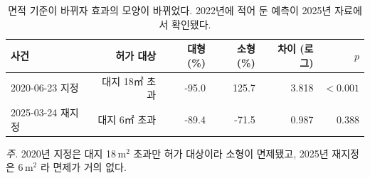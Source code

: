 \begin{table}[htbp]
  \centering
  \caption{면적 기준이 바뀌자 효과의 모양이 바뀌었다. 2022년에 적어 둔 예측이 2025년 자료에서 확인됐다.}
  \label{tab:size-ddd}
  \begin{tabular}{lrrrrr}
    \toprule
    \textbf{사건} & \textbf{허가 대상} & \textbf{대형 (\%)} & \textbf{소형 (\%)} & \textbf{차이 (로그)} & \textbf{$p$} \\
    \midrule
    2020-06-23 지정 & 대지 18㎡ 초과 & -95.0 & 125.7 & 3.818 & $<0.001$ \\
    2025-03-24 재지정 & 대지 6㎡ 초과 & -89.4 & -71.5 & 0.987 & 0.388 \\
    \bottomrule
  \end{tabular}

  \begin{minipage}{\linewidth}\footnotesize
  \textit{주.} 2020년 지정은 대지 18\,m$^2$ 초과만 허가 대상이라 소형이 면제됐고, 2025년 재지정은 6\,m$^2$ 라 면제가 거의 없다.
  \end{minipage}
\end{table}
